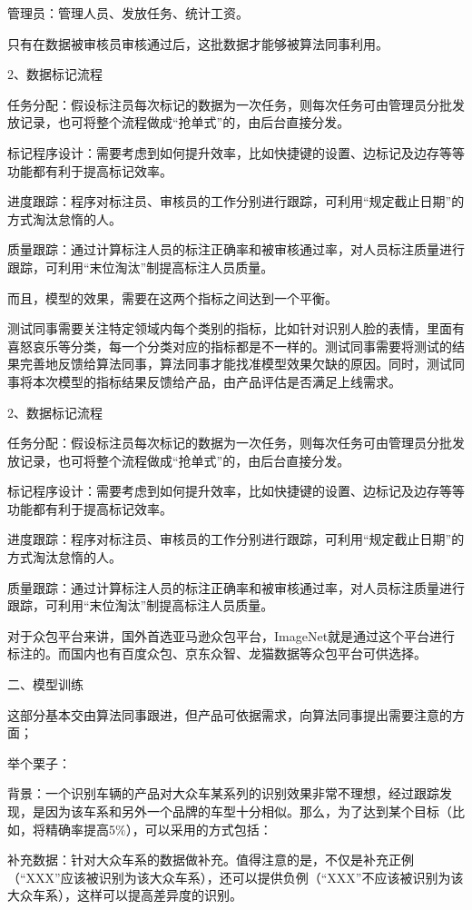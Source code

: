 \documentclass[letterpaper,11pt,english]{sphinxmanual}
\begin{document}
管理员：管理人员、发放任务、统计工资。

只有在数据被审核员审核通过后，这批数据才能够被算法同事利用。

2、数据标记流程

任务分配：假设标注员每次标记的数据为一次任务，则每次任务可由管理员分批发放记录，也可将整个流程做成“抢单式”的，由后台直接分发。

标记程序设计：需要考虑到如何提升效率，比如快捷键的设置、边标记及边存等等功能都有利于提高标记效率。

进度跟踪：程序对标注员、审核员的工作分别进行跟踪，可利用“规定截止日期”的方式淘汰怠惰的人。

质量跟踪：通过计算标注人员的标注正确率和被审核通过率，对人员标注质量进行跟踪，可利用“末位淘汰”制提高标注人员质量。

而且，模型的效果，需要在这两个指标之间达到一个平衡。

测试同事需要关注特定领域内每个类别的指标，比如针对识别人脸的表情，里面有喜怒哀乐等分类，每一个分类对应的指标都是不一样的。测试同事需要将测试的结果完善地反馈给算法同事，算法同事才能找准模型效果欠缺的原因。同时，测试同事将本次模型的指标结果反馈给产品，由产品评估是否满足上线需求。

2、数据标记流程

任务分配：假设标注员每次标记的数据为一次任务，则每次任务可由管理员分批发放记录，也可将整个流程做成“抢单式”的，由后台直接分发。

标记程序设计：需要考虑到如何提升效率，比如快捷键的设置、边标记及边存等等功能都有利于提高标记效率。

进度跟踪：程序对标注员、审核员的工作分别进行跟踪，可利用“规定截止日期”的方式淘汰怠惰的人。

质量跟踪：通过计算标注人员的标注正确率和被审核通过率，对人员标注质量进行跟踪，可利用“末位淘汰”制提高标注人员质量。

对于众包平台来讲，国外首选亚马逊众包平台，ImageNet就是通过这个平台进行标注的。而国内也有百度众包、京东众智、龙猫数据等众包平台可供选择。

二、模型训练

这部分基本交由算法同事跟进，但产品可依据需求，向算法同事提出需要注意的方面；

举个栗子：

背景：一个识别车辆的产品对大众车某系列的识别效果非常不理想，经过跟踪发现，是因为该车系和另外一个品牌的车型十分相似。那么，为了达到某个目标（比如，将精确率提高5\%），可以采用的方式包括：

补充数据：针对大众车系的数据做补充。值得注意的是，不仅是补充正例（“XXX”应该被识别为该大众车系），还可以提供负例（“XXX”不应该被识别为该大众车系），这样可以提高差异度的识别。
\end{document}
